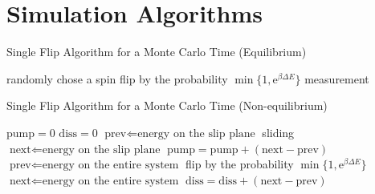 
\chapter{Simulation Algorithms}

\begin{algorithm}                      
	\caption{Single Flip Algorithm for a Monte Carlo Time (Equilibrium)}         
	\label{alg:SFAEMC}                          
	\begin{algorithmic}                  
	\STATE randomly chose a spin
	\STATE flip by the probability $\min\{1, \mathrm{e}^{\beta \Delta E}\}$
	\ENDFOR
	\STATE measurement
	\end{algorithmic}
\end{algorithm}

\begin{algorithm}                      
	\caption{Single Flip Algorithm for a Monte Carlo Time (Non-equilibrium)}         
	\label{alg:SFAEMC}                          
	\begin{algorithmic} 
		\STATE $\text{pump} = 0$  
		\STATE $\text{diss} = 0$                     
			\STATE $\text{prev}\Leftarrow \text{energy on the slip plane}$
			\STATE sliding
			\STATE $\text{next}\Leftarrow \text{energy on the slip plane}$
			\STATE $\text{pump} = \text{pump} + (\text{next} - \text{prev})$
			\\
			\STATE $\text{prev}\Leftarrow \text{energy on the entire system}$
				\STATE flip by the probability $\min\{1, \mathrm{e}^{\beta \Delta E}\}$
			\ENDFOR
			\STATE $\text{next}\Leftarrow \text{energy on the entire system}$
			\STATE $\text{diss} = \text{diss} + (\text{next} - \text{prev})$
		\ENDFOR
	\end{algorithmic}
\end{algorithm}